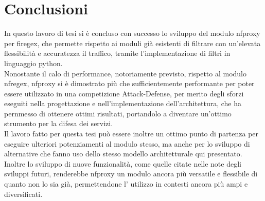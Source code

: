 \chapter*{Conclusioni}

In questo lavoro di tesi si è concluso con successo lo sviluppo del modulo nfproxy per firegex, che permette rispetto ai moduli già esistenti di filtrare con un'elevata flessibilità e accuratezza il traffico, tramite l'implementazione di filtri in linguaggio python.\\
Nonostante il calo di performance, notoriamente previsto, rispetto al modulo nfregex, nfproxy si è dimostrato più che sufficientemente performante per poter essere utilizzato in una competizione Attack-Defense, per merito degli sforzi eseguiti nella progettazione e nell'implementazione
dell'architettura, che ha pernmesso di ottenere ottimi risultati, portandolo a diventare un'ottimo strumento per la difesa dei servizi.\\

Il lavoro fatto per questa tesi può essere inoltre un ottimo punto di partenza per eseguire ulteriori potenziamenti al modulo stesso, ma anche per lo sviluppo di alternative che fanno uso dello stesso modello architetturale qui presentato.\\
Inoltre lo sviluppo di nuove funzionalità, come quelle citate nelle note degli sviluppi futuri, renderebbe nfproxy un modulo ancora più versatile e flessibile di quanto non lo sia già, permettendone l' utilizzo in contesti ancora più ampi e diversificati.\\

